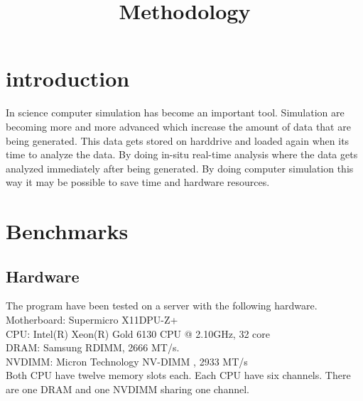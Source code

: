 \documentclass[12pt,a4paper,USenglish]{article}      %
\title{Methodology}  %
\begin{document}

\section{introduction}
In science computer simulation has become an important tool. Simulation are becoming more and more advanced which increase the amount of data that are being generated. This data gets stored on harddrive and loaded again when its time to analyze the data. By doing in-situ real-time analysis where the data gets analyzed immediately after being generated. By doing computer simulation this way it may be possible to save time and hardware resources.

 

\section{Benchmarks}

\subsection{Hardware}
The program have been tested on a server with the following hardware.\\
Motherboard: Supermicro X11DPU-Z+ \\
CPU: Intel(R) Xeon(R) Gold 6130 CPU @ 2.10GHz, 32 core \\
DRAM: Samsung RDIMM, 2666 MT/s. \\
NVDIMM: Micron Technology NV-DIMM , 2933 MT/s \\

Both CPU have twelve memory slots each. Each CPU have six channels. There are one DRAM and one NVDIMM sharing one channel.
\end{document}
